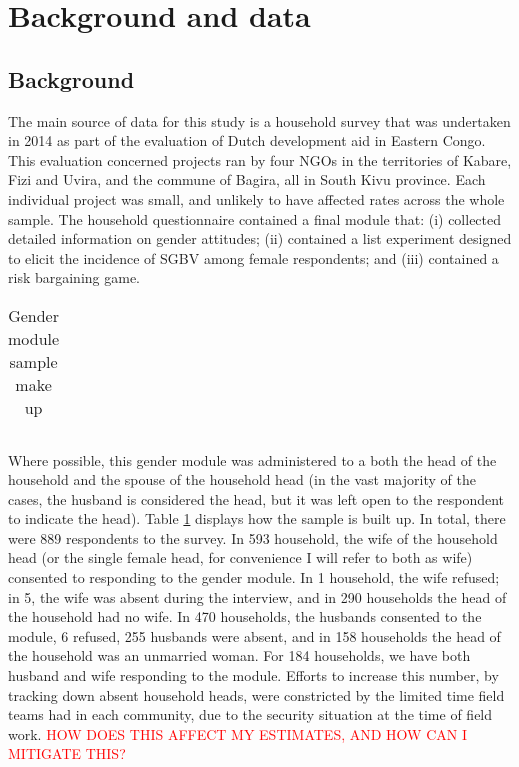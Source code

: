 \documentclass[11pt,a4paper]{scrartcl} %
\newcommand{\tableloc}{C:/Users/Koen/Dropbox/PhD/Papers/CongoGBV/Tables}
\begin{document}
\section*{Background and data}
\paragraph{}
\subsection*{Background}
The main source of data for this study is a household survey that was undertaken in 2014 as part of the evaluation of Dutch development aid in Eastern Congo. This evaluation concerned projects ran by four NGOs in the territories of Kabare, Fizi and Uvira, and the commune of Bagira, all in South Kivu province. Each individual project was small, and unlikely to have affected rates across the whole sample. The household questionnaire contained a final module that: (i) collected detailed information on gender attitudes; (ii) contained a list experiment designed to elicit the incidence of SGBV among female respondents; and (iii) contained a risk bargaining game. 

\begin{table}[htbp]
	\centering
	\caption{Gender module sample make up}
	\label{tab:bargsample}
	\begin{tabular}{l c c c c c}
		\toprule
		
		\bottomrule
	\end{tabular}
\end{table}

\paragraph{}
Where possible, this gender module was administered to a both the head of the household and the spouse of the household head (in the vast majority of the cases, the husband is considered the head, but it was left open to the respondent to indicate the head). Table \ref{tab:bargsample} displays how the sample is built up. In total, there were 889 respondents to the survey. In 593 household, the wife of the household head (or the single female head, for convenience I will refer to both as wife) consented to responding to the gender module. In 1 household, the wife refused; in 5, the wife was absent during the interview, and in 290 households the head of the household had no wife. In 470 households, the husbands consented to the module, 6 refused, 255 husbands were absent, and in 158 households the head of the household was an unmarried woman. For 184 households, we have both husband and wife responding to the module. Efforts to increase this number, by tracking down absent household heads, were constricted by the limited time field teams had in each community, due to the security situation at the time of field work. \textcolor{red}{HOW DOES THIS AFFECT MY ESTIMATES, AND HOW CAN I MITIGATE THIS?}
\end{document}
